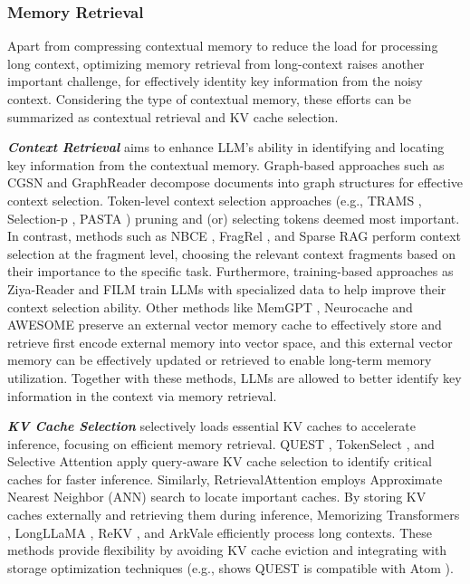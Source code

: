 \documentclass[manuscript,screen]{acmart}
\begin{document}
\subsubsection{Memory Retrieval}
Apart from compressing contextual memory to reduce the load for processing long context, optimizing memory retrieval from long-context raises another important challenge, for effectively identity key information from the noisy context. Considering the type of contextual memory, these efforts can be summarized as contextual retrieval and KV cache selection.

\textit{\textbf{Context Retrieval}} aims to enhance LLM's ability in identifying and locating key information from the contextual memory. Graph-based approaches such as CGSN \citep{nie-etal-2022-capturing} and GraphReader \citep{li-etal-2024-graphreader} decompose documents into graph structures for effective context selection. Token-level context selection approaches (e.g., TRAMS \citep{yu-etal-2023-trams}, Selection-p \citep{chung-etal-2024-selection}, PASTA \citep{zhang2024tell}) pruning and (or) selecting tokens deemed most important. In contrast, methods such as NBCE \citep{su-etal-2024-naive}, FragRel \citep{yue-etal-2024-fragrel}, and Sparse RAG \citep{zhu2025accelerating} perform context selection at the fragment level, choosing the relevant context fragments based on their importance to the specific task. Furthermore, training-based approaches as Ziya-Reader \citep{he-etal-2024-never} and FILM \citep{NEURIPS2024_71c3451f} train LLMs with specialized data to help improve their context selection ability. Other methods like MemGPT \citep{packer2023memgpt}, Neurocache \citep{safaya-yuret-2024-neurocache} and AWESOME \citep{cao-wang-2024-awesome} preserve an external vector memory cache to effectively store and retrieve first encode external memory into vector space, and this external vector memory can be effectively updated or retrieved to enable long-term memory utilization. Together with these methods, LLMs are allowed to better identify key information in the context via memory retrieval. 

\textit{\textbf{KV Cache Selection}} selectively loads essential KV caches to accelerate inference, focusing on efficient memory retrieval. QUEST \citep{pmlr-v235-tang24l}, TokenSelect \citep{wu2025tokenselectefficientlongcontextinference}, and Selective Attention \citep{leviathan2025selective} apply query-aware KV cache selection to identify critical caches for faster inference. Similarly, RetrievalAttention \citep{liu2024retrievalattentionacceleratinglongcontextllm} employs Approximate Nearest Neighbor (ANN) search to locate important caches. By storing KV caches externally and retrieving them during inference, Memorizing Transformers \citep{wu2022memorizing}, LongLLaMA \citep{NEURIPS2023_8511d06d}, ReKV \citep{di2025streaming}, and ArkVale \citep{NEURIPS2024_cd4b4937} efficiently process long contexts. These methods provide flexibility by avoiding KV cache eviction and integrating with storage optimization techniques (e.g., \citet{pmlr-v235-tang24l} shows QUEST is compatible with Atom \citep{ZhaoLZYC0CK0K24}).
\end{document}
